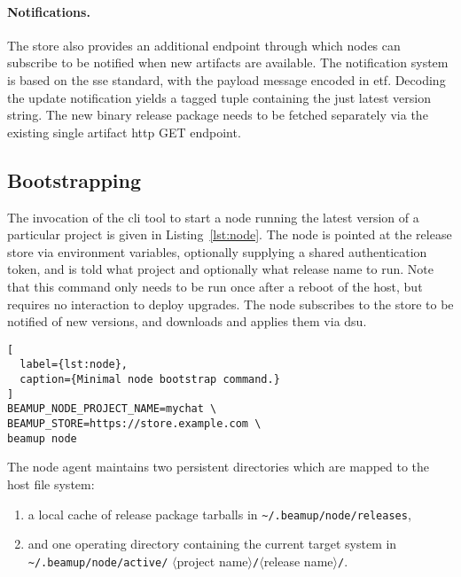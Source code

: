 \paragraph{Notifications.} The store also provides an additional endpoint through which nodes can subscribe to be notified when new artifacts are available. The notification system is based on the \acrfull{sse} standard, with the payload message encoded in \acrfull{etf}. Decoding the update notification yields a tagged tuple containing the just latest version string. The new binary release package needs to be fetched separately via the existing single artifact \acrshort{http} GET endpoint.



\cleardoublepage
\subsection{Bootstrapping}
The invocation of the \acrshort{cli} tool to start a node running the latest version of a particular project is given in Listing~\ref{lst:node}. The node is pointed at the release store via environment variables, optionally supplying a shared authentication token, and is told what project and optionally what release name to run. Note that this command only needs to be run once after a reboot of the host, but requires no interaction to deploy upgrades. The node subscribes to the store to be notified of new versions, and downloads and applies them via \acrshort{dsu}.

\begin{lstlisting}[
  label={lst:node},
  caption={Minimal node bootstrap command.}
]
BEAMUP_NODE_PROJECT_NAME=mychat \
BEAMUP_STORE=https://store.example.com \
beamup node
\end{lstlisting}

The node agent maintains two persistent directories which are mapped to the host file system: \begin{enumerate}[label=(\roman*)]
  \item a local cache of release package tarballs in \lstinline[breaklines=true]|~/.beamup/node/releases|,
  \item and one operating directory containing the current target system in \lstinline[breaklines=true]|~/.beamup/node/active/|
  $\langle$project name$\rangle$\lstinline|/|$\langle$release name$\rangle$\lstinline|/|.
\end{enumerate}


